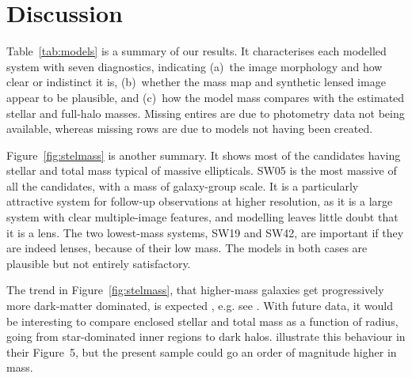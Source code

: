 \section{Discussion}\label{sec:summary}

Table~\ref{tab:models} is a summary of our results.  It characterises
each modelled system with seven diagnostics, indicating (a)~the image
morphology and how clear or indistinct it is, (b)~whether the mass map
and synthetic lensed image appear to be plausible, and (c)~how the
model mass compares with the estimated stellar and full-halo masses.
Missing entires are due to photometry data not being available, whereas
missing rows are due to models not having been created.

Figure~\ref{fig:stelmass} is another summary.  It shows most of the
candidates having stellar and total mass typical of massive
ellipticals.  SW05 is the most massive of all the candidates, with a
mass of galaxy-group scale.  It is a particularly attractive system
for follow-up observations at higher resolution, as it is a large system
with clear multiple-image features, and modelling leaves little doubt
that it is a lens.  The two lowest-mass systems, SW19 and SW42, are
important if they are indeed lenses, because of their low mass.  The
models in both cases are plausible but not entirely satisfactory.

The trend in Figure~\ref{fig:stelmass}, that higher-mass galaxies get
progressively more dark-matter dominated, is expected
, e.g. see \cite{2005ApJ...623L...5F}.
With future data, it would be interesting to compare enclosed
stellar and total mass as a function of radius, going from
star-dominated inner regions to dark halos.
\cite{2011ApJ...740...97L} illustrate this behaviour in their
Figure~5, but the present sample could go an order of magnitude higher
in mass.

